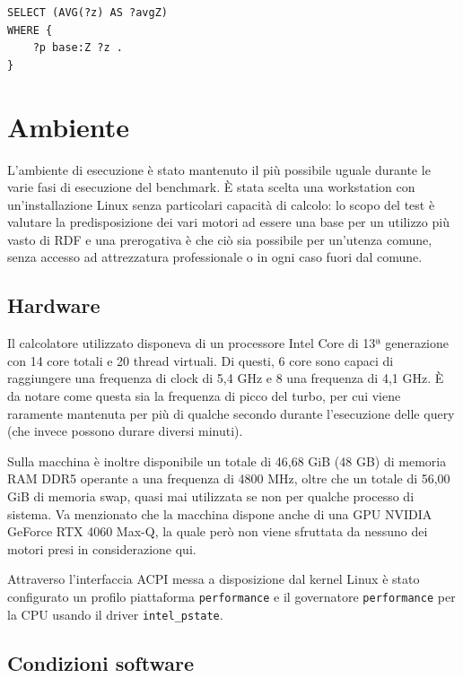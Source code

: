 \begin{lstlisting}[language=SPARQL]
SELECT (AVG(?z) AS ?avgZ)
WHERE {
    ?p base:Z ?z .
}
\end{lstlisting}


\section{Ambiente}
\label{sec:environment}

L'ambiente di esecuzione è stato mantenuto il più possibile uguale durante le varie fasi di esecuzione del benchmark.
È stata scelta una workstation con un'installazione Linux senza particolari capacità di calcolo: lo scopo del test
è valutare la predisposizione dei vari motori ad essere una base per un utilizzo più vasto di RDF e una prerogativa
è che ciò sia possibile per un'utenza comune, senza accesso ad attrezzatura professionale o in ogni caso fuori dal comune.

\subsection{Hardware}

Il calcolatore utilizzato disponeva di un processore Intel Core di 13ª generazione con 14 core totali e 20 thread virtuali. Di questi,
6 core sono capaci di raggiungere una frequenza di clock di 5,4 GHz e 8 una frequenza di 4,1 GHz. È da notare come questa sia la 
frequenza di picco del turbo, per cui viene raramente mantenuta per più di qualche secondo durante l'esecuzione delle query 
(che invece possono durare diversi minuti).
\par Sulla macchina è inoltre disponibile un totale di 46,68 GiB (48 GB) di memoria RAM DDR5 operante a una frequenza di 
4800 MHz, oltre che un totale di 56,00 GiB di memoria swap, quasi mai utilizzata se non per qualche processo di sistema.
Va menzionato che la macchina dispone anche di una GPU NVIDIA GeForce RTX 4060 Max-Q, la quale però non viene sfruttata da nessuno dei
motori presi in considerazione qui.
\par Attraverso l'interfaccia ACPI messa a disposizione dal kernel Linux è stato configurato un profilo piattaforma \texttt{performance} e
il governatore \texttt{performance} per la CPU usando il driver \texttt{intel\_pstate}.

\subsection{Condizioni software}
\label{ssec:cond_soft}

